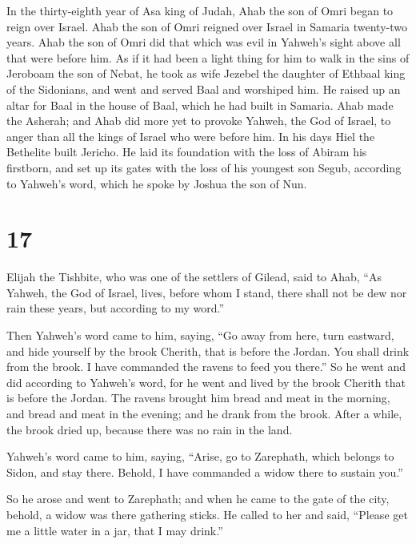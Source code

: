  In the thirty-eighth year of Asa king of Judah, Ahab the
son of Omri began to reign over Israel. Ahab the son of Omri reigned
over Israel in Samaria twenty-two years.  Ahab the son of
Omri did that which was evil in Yahweh's sight above all that were
before him.  As if it had been a light thing for him to
walk in the sins of Jeroboam the son of Nebat, he took as wife Jezebel
the daughter of Ethbaal king of the Sidonians, and went and served Baal
and worshiped him.  He raised up an altar for Baal in the
house of Baal, which he had built in Samaria.  Ahab made
the Asherah; and Ahab did more yet to provoke Yahweh, the God of Israel,
to anger than all the kings of Israel who were before him. 
In his days Hiel the Bethelite built Jericho. He laid its foundation
with the loss of Abiram his firstborn, and set up its gates with the
loss of his youngest son Segub, according to Yahweh's word, which he
spoke by Joshua the son of Nun.

\hypertarget{section-16}{%
\section{17}\label{section-16}}

 Elijah the Tishbite, who was one of the settlers of Gilead,
said to Ahab, ``As Yahweh, the God of Israel, lives, before whom I
stand, there shall not be dew nor rain these years, but according to my
word.''

 Then Yahweh's word came to him, saying,  ``Go
away from here, turn eastward, and hide yourself by the brook Cherith,
that is before the Jordan.  You shall drink from the brook.
I have commanded the ravens to feed you there.''  So he went
and did according to Yahweh's word, for he went and lived by the brook
Cherith that is before the Jordan.  The ravens brought him
bread and meat in the morning, and bread and meat in the evening; and he
drank from the brook.  After a while, the brook dried up,
because there was no rain in the land.

 Yahweh's word came to him, saying,  ``Arise, go
to Zarephath, which belongs to Sidon, and stay there. Behold, I have
commanded a widow there to sustain you.''

 So he arose and went to Zarephath; and when he came to the
gate of the city, behold, a widow was there gathering sticks. He called
to her and said, ``Please get me a little water in a jar, that I may
drink.''

